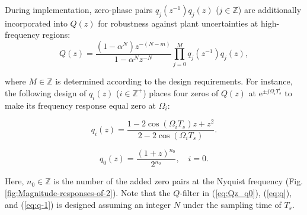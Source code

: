 \documentclass [11pt, proquest] {uwthesis}[2020/02/24]
\begin{document}
During implementation, zero-phase pairs $q_{j}(z^{-1})q_{j}(z)$ ($j\in\mathbb{Z}$)
are additionally incorporated into $Q(z)$ for robustness against
plant uncertainties at high-frequency regions:
\begin{equation}
Q(z)=\frac{(1-\alpha^{N})z^{-(N-m)}}{1-\alpha^{N}z^{-N}}\prod_{j=0}^{M}q_{j}(z^{-1})q_{j}(z),\label{eq:Qz_q0}
\end{equation}

\noindent where $M\in\mathbb{Z}$ is determined according to the design
requirements. For instance, the following design of $q_{i}(z)$ ($i\in\mathbb{Z}^{+}$)
places four zeros of $Q(z)$ at $\text{e}^{\pm j\Omega_{i}T_{s}^{'}}$
to make its frequency response equal zero at $\Omega_{i}$: 

\noindent 
\begin{equation}
q_{i}(z)=\frac{1-2\cos(\Omega_{i}T_{s})z+z^{2}}{2-2\cos(\Omega_{i}T_{s})}.\label{eq:q}
\end{equation}

\noindent 
\begin{equation}
q_{0}(z)=\frac{(1+z)^{n_{0}}}{2^{n_{0}}},\quad i=0.\label{eq:q-1}
\end{equation}

\noindent Here, $n_{0}\in\mathbb{Z}$ is the number of the added zero
pairs at the Nyquist frequency (Fig. \ref{fig:Magnitude-responses-of-2}). Note that the $Q$-filter in (\ref{eq:Qz_q0}),
(\ref{eq:q}), and (\ref{eq:q-1}) is designed assuming an integer
$N$ under the sampling time of $T_{s}$.
\end{document}
